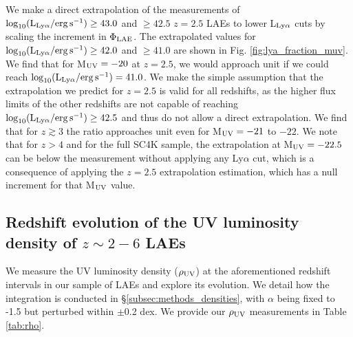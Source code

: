 \documentclass[a4paper,fleqn,usenatbib]{mnras}
\begin{document}
We make a direct extrapolation of the measurements of $\log_{10} (\rm L_{Ly\alpha}/erg\,s^{-1}) \geq 43.0$ and $\geq 42.5$ $z=2.5$ LAEs to lower L$_{\rm Ly\alpha}$ cuts by scaling the increment in $\Phi_{\rm LAE}$. The extrapolated values for $\log_{10} (\rm L_{Ly\alpha}/erg\,s^{-1}) \geq 42.0$ and $\geq 41.0$ are shown in Fig. \ref{fig:lya_fraction_muv}. We find that for M$_{\rm UV}=-20$ at $z=2.5$, we would approach unit if we could reach $\log_{10} (\rm L_{Ly\alpha}/erg\,s^{-1})=41.0$. We make the simple assumption that the extrapolation we predict for $z=2.5$ is valid for all redshifts, as the higher flux limits of the other redshifts are not capable of reaching $\log_{10} (\rm L_{Ly\alpha}/erg\,s^{-1}) \geq 42.5$ and thus do not allow a direct extrapolation. We find that for $z\gtrsim3$ the ratio approaches unit even for M$_{\rm UV}=-21$ to $-22$. We note that for $z>4$ and for the full SC4K sample, the extrapolation at M$_{\rm UV}=-22.5$ can be below the measurement without applying any Ly$\alpha$ cut, which is a consequence of applying the $z=2.5$ extrapolation estimation, which has a null increment for that M$_{\rm UV}$ value.


\subsection{Redshift evolution of the UV luminosity density of $z\sim2-6$ LAEs}  \label{sec:smd_evo}

We measure the UV luminosity density ($\rho_{\rm UV}$) at the aforementioned redshift intervals in our sample of LAEs and explore its evolution. We detail how the integration is conducted in \S\ref{subsec:methods_densities}, with $\alpha$ being fixed to -1.5 but perturbed within $\pm$0.2 dex. We provide our $\rho_{\rm UV}$ measurements in Table \ref{tab:rho}.
\end{document}
